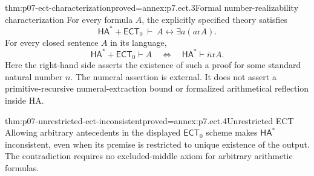 \begin{hbtheorem}{thm:p07-ect-characterization}{proved=annex:p7.ect.3}{Formal number-realizability characterization}
For every formula \(A\), the explicitly specified theory satisfies
\[
 \mathsf{HA}^{\ast}+\mathsf{ECT}_0\ \vdash\
 A\longleftrightarrow\exists a(a\mathrel{\mathrm r}A).
\]
For every closed sentence \(A\) in its language,
\[
 \mathsf{HA}^{\ast}+\mathsf{ECT}_0\vdash A
 \quad\Longleftrightarrow\quad
 \mathsf{HA}^{\ast}\vdash\overline n\mathrel{\mathrm r}A.
\]
Here the right-hand side asserts the existence of such a proof for
some standard natural number \(n\). The numeral assertion is external. It does not assert a
primitive-recursive numeral-extraction bound or formalized
arithmetical reflection inside HA.
\end{hbtheorem}

\begin{hbtheorem}{thm:p07-unrestricted-ect-inconsistent}{proved=annex:p7.ect.4}{Unrestricted ECT}
Allowing arbitrary antecedents in the displayed
\(\mathsf{ECT}_0\) scheme makes \(\mathsf{HA}^{\ast}\)
inconsistent, even when its premise is restricted to unique
existence of the output. The contradiction requires no excluded-middle
axiom for arbitrary arithmetic formulas.
\end{hbtheorem}
